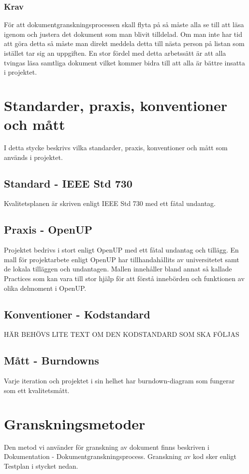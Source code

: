 \subsubsection{Krav}
För att dokumentgranskningsprocessen skall flyta på så måste alla se till att läsa igenom och justera det dokument som man blivit tilldelad. Om man inte har tid att göra detta så måste man direkt meddela detta till nästa person på listan som istället tar sig an uppgiften. En stor fördel med detta arbetssätt är att alla tvingas läsa samtliga dokument vilket kommer bidra till att alla är bättre insatta i projektet.

\section{Standarder, praxis, konventioner och mått}
I detta stycke beskrivs vilka standarder, praxis, konventioner och mått som används i projektet.

\subsection{Standard - IEEE Std 730}
Kvalitetsplanen är skriven enligt IEEE Std 730 med ett fåtal undantag.

\subsection{Praxis - OpenUP}
Projektet bedrivs i stort enligt OpenUP med ett fåtal undantag och tillägg. En mall för projektarbete enligt OpenUP har tillhandahållits av universitetet samt de lokala tilläggen och undantagen. Mallen innehåller bland annat så kallade Practices som kan vara till stor hjälp för att förstå innebörden och funktionen av olika delmoment i OpenUP.

\subsection{Konventioner - Kodstandard}
HÄR BEHÖVS LITE TEXT OM DEN KODSTANDARD SOM SKA FÖLJAS

\subsection{Mått - Burndowns}
Varje iteration och projektet i sin helhet har burndown-diagram som fungerar som ett kvalitetsmått. 

\section{Granskningsmetoder}
Den metod vi använder för granskning av dokument finns beskriven i Dokumentation - Dokumentgranskningsprocess. Granskning av kod sker enligt Testplan i stycket nedan.


